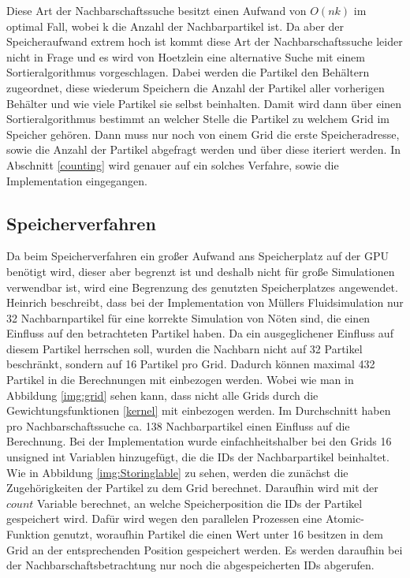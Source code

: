\documentclass[intern,palatino]{cgBA}
\begin{document}
Diese Art der Nachbarschaftssuche besitzt einen Aufwand von $O(n k)$ im optimal Fall, wobei k die Anzahl der Nachbarpartikel ist. Da aber der Speicheraufwand extrem hoch ist kommt diese Art der Nachbarschaftssuche leider nicht in Frage und es wird von Hoetzlein \cite{nvidia} eine alternative Suche mit einem Sortieralgorithmus vorgeschlagen.
\newline
Dabei werden die Partikel den Behältern zugeordnet, diese wiederum Speichern die Anzahl der Partikel aller vorherigen Behälter und wie viele Partikel sie selbst beinhalten. Damit wird dann über einen Sortieralgorithmus bestimmt an welcher Stelle die Partikel zu welchem Grid im Speicher gehören. Dann muss nur noch von einem Grid die erste Speicheradresse, sowie die Anzahl der Partikel abgefragt werden und über diese iteriert werden.
\newline
In Abschnitt \ref{counting} wird genauer auf ein solches Verfahre, sowie die Implementation eingegangen.


\subsection{Speicherverfahren}\label{speicher}

Da beim Speicherverfahren ein großer Aufwand ans Speicherplatz auf der GPU benötigt wird, dieser aber begrenzt ist und deshalb nicht für große Simulationen verwendbar ist, wird eine Begrenzung des genutzten Speicherplatzes angewendet. Heinrich \cite{nvidia2} beschreibt, dass bei der Implementation von Müllers \cite{muller2003particle} Fluidsimulation nur 32 Nachbarnpartikel für eine korrekte Simulation von Nöten sind, die einen Einfluss auf den betrachteten Partikel haben. Da ein ausgeglichener Einfluss auf diesem Partikel herrschen soll, wurden die Nachbarn nicht auf 32 Partikel beschränkt, sondern auf 16 Partikel pro Grid. Dadurch können maximal 432 Partikel in die Berechnungen mit einbezogen werden. Wobei wie man in Abbildung \ref{img:grid} sehen kann, dass nicht alle Grids durch die Gewichtungsfunktionen \ref{kernel} mit einbezogen werden. Im Durchschnitt haben pro Nachbarschaftssuche ca. 138 Nachbarpartikel einen Einfluss auf die Berechnung.
\newline
Bei der Implementation wurde einfachheitshalber bei den Grids 16 unsigned int Variablen hinzugefügt, die die IDs der Nachbarpartikel beinhaltet.
\newline
Wie in Abbildung \ref{img:Storinglable} zu sehen, werden die zunächst die Zugehörigkeiten der Partikel zu dem Grid berechnet. Daraufhin wird mit der $count$ Variable berechnet, an welche Speicherposition die IDs der Partikel gespeichert wird. Dafür wird wegen den parallelen Prozessen eine Atomic-Funktion genutzt, woraufhin Partikel die einen Wert unter 16 besitzen in dem Grid an der entsprechenden Position gespeichert werden. Es werden daraufhin bei der Nachbarschaftsbetrachtung nur noch die abgespeicherten IDs abgerufen. 
\end{document}
